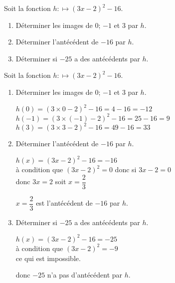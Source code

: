 \begin{exercice}
    Soit la fonction $h:\longmapsto (3x-2)^2-16$.
    \begin{enumerate} 
        \item Déterminer les images de $0$; $-1$ et $3$ par $h$.
        \item Déterminer l'antécédent de $-16$ par $h$.
        \item Déterminer si $-25$ a des antécédents par $h$.
    \end{enumerate}
\end{exercice}
\begin{corrige}
    Soit la fonction $h:\longmapsto (3x-2)^2-16$.

    \begin{enumerate} 
        \item Déterminer les images de $0$; $-1$ et $3$ par $h$.
        
        {\red $h(0)=(3\times 0 -2)^2-16=4-16=-12$\\}
        {\red $h(-1)=(3\times(-1) -2)^2-16=25-16=9$\\}
        {\red $h(3)=(3\times 3 -2)^2-16=49-16=33$}
        \item Déterminer l'antécédent de $-16$ par $h$.
        
        {\red $h(x)=(3x-2)^2-16=-16$\\ à condition que $(3x-2)^2=0$ donc si $3x-2=0$\\ donc $3x=2$ soit $x=\dfrac{2}{3}$
        
        $x=\dfrac{2}{3}$ est l'antécédent de $-16$ par $h$.
        }
        \smallskip
        \item Déterminer si $-25$ a des antécédents par $h$.
        
        {\red $h(x)=(3x-2)^2-16=-25$\\ à condition que $(3x-2)^2=-9$\\ ce qui est impossible.
        
        donc $-25$ n'a pas d'antécédent par $h$.
        }
    \end{enumerate}
\end{corrige}
